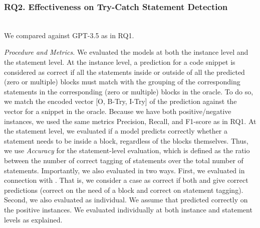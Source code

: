 \subsubsection{RQ2. Effectiveness on Try-Catch Statement Detection}~\\
 We compared {\xstate} against GPT-3.5 as in RQ1.




{\em Procedure and Metrics.} We evaluated the models at both the
instance level and the statement level. At the instance level, a
prediction for a code snippet is considered as correct if all the
statements inside or outside of all the predicted (zero or
multiple)  blocks must match with the grouping of the
corresponding statements in the corresponding (zero or
multiple)  blocks in the oracle. To do so, we match
the encoded vector [O, B-Try, I-Try] of the prediction against the
vector for a snippet in the oracle. Because we have both
positive/negative instances, we used the same metrics Precision,
Recall, and F1-score as in RQ1. At the statement level, we evaluated
if a model predicts correctly whether a statement needs to be inside
a  block, regardless of the blocks themselves. Thus,
we use {\em Accuracy} for the statement-level evaluation, which is
defined as the ratio between the number of correct tagging of
statements over the total number of statements.  Importantly, we also
evaluated {\tool} in two ways. First, we evaluated {\xstate} in
connection with {\xblock}. That is, we consider a case as correct if
both {\xblock} and {\xstate} give correct predictions (correct on the
need of a  block and correct on statement
tagging). Second, we also evaluated {\xstate} as individual. We assume
that {\xblock} predicted correctly on the positive instances. We
evaluated {\xstate} individually at both instance and statement levels
as explained.


